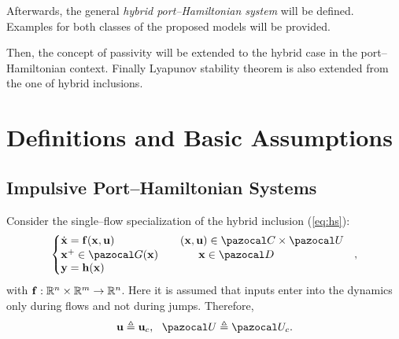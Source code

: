 %
Afterwards, the general \textit{hybrid port--Hamiltonian system} will be defined. Examples for both classes of the proposed models will be provided.
%
\newline

%
Then, the concept of passivity will be extended to the hybrid case in the port--Hamiltonian context. Finally Lyapunov stability theorem is also extended from the one of hybrid inclusions. 
%
\clearpage
\section{Definitions and Basic Assumptions}
\subsection{Impulsive Port--Hamiltonian Systems}
%
Consider the single--flow specialization of the hybrid inclusion (\ref{eq:hs}):
%
\begin{equation}\label{eq:hs_singleflow}
    \left\{ 
        \begin{matrix*}[l]\vspace{1pt}
            \dot{\xb} = \mathbf{f}(\xb,\ub) && (\xb,\ub)\in\C\times\U\\
            \xb^+ \in \G(\xb)&&\quad~~\xb\in\D\\
            \yb = \mathbf{h}(\xb)
        \end{matrix*}
    \right.~~,
\end{equation}
%    
with $\mathbf{f}:\mathbb{R}^n\times\mathbb{R}^m\rightarrow\mathbb{R}^n$.
Here it is assumed that inputs enter into the dynamics only during flows and not during jumps. Therefore, 
%
\begin{equation}
    \ub\triangleq\ub_c,~~\U\triangleq\U_c.
\end{equation}
%

